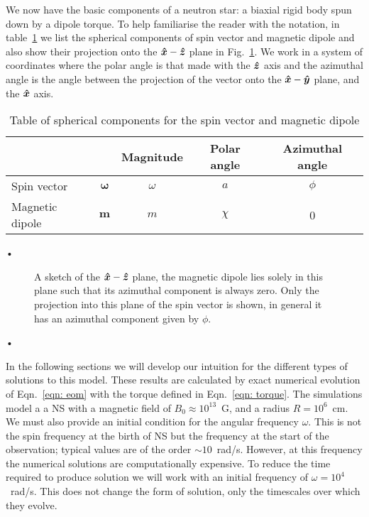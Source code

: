 \documentclass[../full_thesis/full_thesis.tex]{subfiles}
\newcommand{\thisdir}{../rotating_frame}
\begin{document}
We now have the basic components of a neutron star: a biaxial rigid body spun
down by a dipole torque. To help familiarise the reader with the notation, in
table~\ref{tab: definitions} we list the spherical components of spin vector
and magnetic dipole and also show their projection onto the $\boldsymbol{\hat{x}}-\boldsymbol{\hat{z}}$ plane in
Fig.~\ref{fig: sketch01}. We work in a system of coordinates where the polar
angle is that made with the $\boldsymbol{\hat{z}}$ axis and the azimuthal angle is the angle between
the projection of the vector onto the $\boldsymbol{\hat{x}}-\boldsymbol{\hat{y}}$ plane, and the $\boldsymbol{\hat{x}}$ axis.
\begin{table}[ht]
\centering
\begin{tabular}{|l|c|c|c|c|} \hline
 \multicolumn{2}{|c|}{} & Magnitude & Polar angle & Azimuthal angle \\ \hline
Spin vector  & $\boldsymbol{\omega}$ & $\omega$ & $a$ & $\phi$ \\ \hline
Magnetic dipole &  $\boldsymbol{m}$ & $m$ & $\chi$ & 0 \\ \hline
\end{tabular}•
\caption{Table of spherical components for the spin vector and magnetic dipole}
\label{tab: definitions}
\end{table}

\begin{figure}[ht]
\centering

\caption{A sketch of the  $\boldsymbol{\hat{x}}-\boldsymbol{\hat{z}}$ plane,  the magnetic dipole lies solely in
this plane such that its azimuthal component is always zero.  Only the
projection into this plane of the spin vector is shown, in general it has an
azimuthal component given by $\phi$.}
	\label{fig: sketch01}
\end{figure}•

In the following sections we will develop our intuition for the different types
of solutions to this model. These results are calculated by 
exact numerical evolution of Eqn.~\eqref{eqn: eom} with the torque defined in
Eqn.~\eqref{eqn: torque}. The simulations model a a NS with a magnetic field of
$B_{0}\approx10^{13}$~G, and a radius $R=10^{6}$~cm. We must also provide an
initial condition for the angular frequency $\omega$. This is not the spin
frequency at the birth of NS but the frequency at the start of the observation;
typical values are of the order $\sim 10$~rad/s. However, at this frequency the
numerical solutions are computationally expensive. To reduce the time required
to produce solution we will work with an initial frequency of $\omega =
10^{4}$~rad/s. This does not change the form of solution, only the timescales
over which they evolve.
\end{document}
